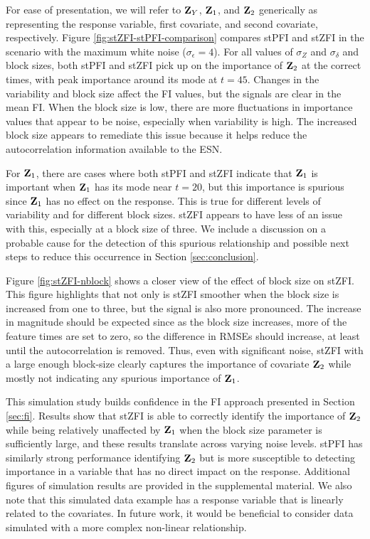\documentclass[AMS,STIX2COL]{WileyNJD-v2}
\begin{document}
For ease of presentation, we will refer to ${\bf Z}_Y$, ${\bf Z}_1$, and ${\bf Z}_2$ generically as representing the response variable, first covariate, and second covariate, respectively. Figure \ref{fig:stZFI-stPFI-comparison} compares stPFI and stZFI in the scenario with the maximum white noise ($\sigma_{\epsilon}=4$). For all values of $\sigma_{Z}$ and $\sigma_{\delta}$ and block sizes, both stPFI and stZFI pick up on the importance of ${\bf Z}_2$ at the correct times, with peak importance around its mode at $t=45$. Changes in the variability and block size affect the FI values, but the signals are clear in the mean FI. When the block size is low, there are more fluctuations in importance values that appear to be noise, especially when variability is high. The increased block size appears to remediate this issue because it helps reduce the autocorrelation information available to the ESN.

For ${\bf Z}_1$, there are cases where both stPFI and stZFI indicate that ${\bf Z}_1$ is important when ${\bf Z}_1$ has its mode near $t=20$, but this importance is spurious since ${\bf Z}_1$ has no effect on the response. This is true for different levels of variability and for different block sizes. stZFI appears to have less of an issue with this, especially at a block size of three. We include a discussion on a probable cause for the detection of this spurious relationship and possible next steps to reduce this occurrence in Section \ref{sec:conclusion}.

Figure \ref{fig:stZFI-nblock} shows a closer view of the effect of block size on stZFI. This figure highlights that not only is stZFI smoother when the block size is increased from one to three, but the signal is also more pronounced. The increase in magnitude should be expected since as the block size increases, more of the feature times are set to zero, so the difference in RMSEs should increase, at least until the autocorrelation is removed. Thus, even with significant noise, stZFI with a large enough block-size clearly captures the importance of covariate ${\bf Z}_2$ while mostly not indicating any spurious importance of ${\bf Z}_1$.

This simulation study builds confidence in the FI approach presented in Section \ref{sec:fi}. Results show that stZFI is able to correctly identify the importance of ${\bf Z}_2$ while being relatively unaffected by ${\bf Z}_1$ when the block size parameter is sufficiently large, and these results translate across varying noise levels. stPFI has similarly strong performance identifying ${\bf Z}_2$ but is more susceptible to detecting importance in a variable that has no direct impact on the response. Additional figures of simulation results are provided in the supplemental material. We also note that this simulated data example has a response variable that is linearly related to the covariates. In future work, it would be beneficial to consider data simulated with a more complex non-linear relationship.
\end{document}
